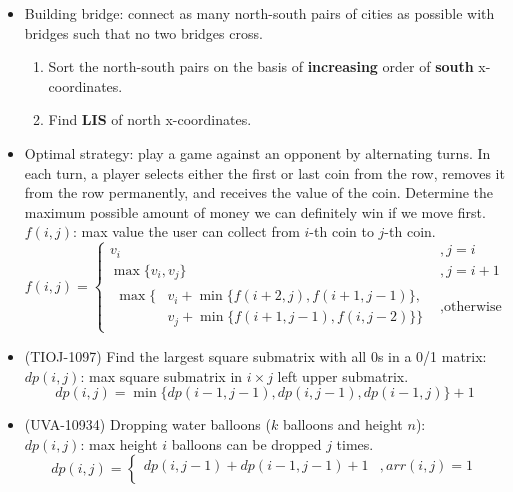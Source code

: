 \begin{itemize}
\begin{enumerate}
    \end{enumerate}
    \item Building bridge: connect as many north-south pairs of cities as possible with bridges such that no two bridges cross. \begin{enumerate}
        \item Sort the north-south pairs on the basis of \textbf{increasing} order of \textbf{south} x-coordinates.
        \item Find \textbf{LIS} of north x-coordinates.
    \end{enumerate}
    \item Optimal strategy: play a game against an opponent by alternating turns. In each turn, a player selects either the first or last coin from the row, removes it from the row permanently, and receives the value of the coin. Determine the maximum possible amount of money we can definitely win if we move first. \\
    $f(i, j)$: max value the user can collect from $i$-th coin to $j$-th coin.\begin{equation}
        f(i, j) = \begin{cases}
            v_i &, j = i \\
            \max\{v_i, v_j\} &, j = i + 1 \\
            \begin{aligned}
                \max\{& v_i + \min\{f(i + 2, j), f(i + 1, j -1)\}, \\
                & v_j + \min\{f(i + 1, j -1), f(i, j - 2)\}\}
            \end{aligned} &, \text{otherwise}
        \end{cases}
    \end{equation}
    \item (TIOJ-1097) Find the largest square submatrix with all 0s in a 0/1 matrix: \\ 
    $dp(i, j)$: max square submatrix in $i \times j$ left upper submatrix. \begin{equation}
        dp(i, j) = \min\{dp(i − 1, j − 1), dp(i, j − 1), dp(i − 1,j)\} + 1
    \end{equation}
    \item (UVA-10934) Dropping water balloons ($k$ balloons and height $n$): \\ 
    $dp(i, j)$: max height $i$ balloons can be dropped $j$ times. \begin{equation}
        dp(i, j) = \begin{cases}
            dp(i, j - 1) + dp(i - 1, j - 1) + 1 &, arr(i, j) = 1 \\

\end{cases}
\end{equation}
\end{itemize}
